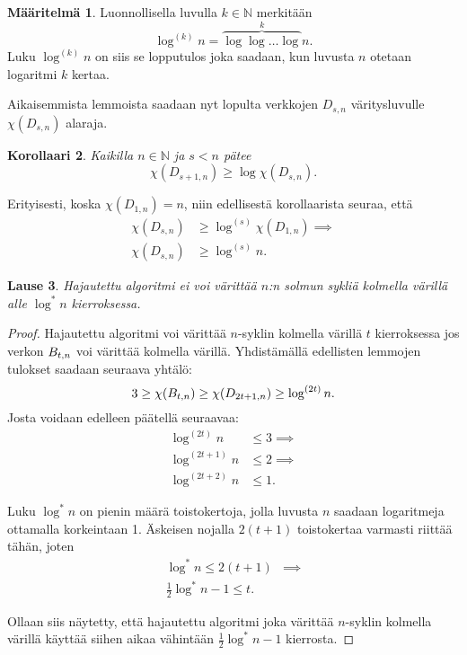 \documentclass[finnish]{tktltiki2}
\newtheorem{lau}{Lause}
\newtheorem{kor}[lau]{Korollaari}
\theoremstyle{definition}
\newtheorem{maar}[lau]{Määritelmä}
\theoremstyle{remark}
\newcommand{\nat}{\mathbb{N}}
\newcommand{\Dsn}{D_{s,n}}
\newcommand{\Dssn}{D_{s+1,n}}
\begin{document}
\begin{maar}
    Luonnollisella luvulla $k \in \nat$ merkitään
    \begin{equation*}
        \log^{(k)} n = \overbrace{\log \log \dots \log}^{k} n.
    \end{equation*}
    Luku $\log^{(k)} n$ on siis se lopputulos joka saadaan, kun luvusta $n$
    otetaan logaritmi $k$ kertaa.
\end{maar}

Aikaisemmista lemmoista saadaan nyt lopulta verkkojen $\Dsn$ vä\-ri\-tys\-lu\-vul\-le
$\chi(\Dsn)$ alaraja.

\begin{kor}
    Kaikilla $n \in \nat$ ja $s < n$ pätee
    \begin{equation*}
        \chi(\Dssn) \geq \log \chi(\Dsn).
    \end{equation*}
\end{kor}

Erityisesti, koska $\chi(D_{1,n}) = n$, niin edellisestä korollaarista seuraa, että
%
\begin{align*}
    \chi(\Dsn) &\geq \log^{(s)} \chi(D_{1,n}) \implies \\
    \chi(\Dsn) &\geq \log^{(s)} n.
\end{align*}

\begin{lau}
    Hajautettu algoritmi ei voi värittää $n$:n solmun sykliä kolmella värillä
    alle $\log^* n$ kierroksessa.
\end{lau}

\begin{proof}
    Hajautettu algoritmi voi värittää $n$-syklin kolmella värillä $t$
    kierroksessa jos verkon $B_{t,n}$ voi värittää kolmella värillä. Yhdistämällä
    edellisten lemmojen tulokset saadaan seuraava yhtälö:
    \begin{equation*}
        3 \geq \chi(B_{t,n}) \geq \chi(D_{2t+1, n}) \geq \log^{(2t)} n.
    \end{equation*}
    Josta voidaan edelleen päätellä seuraavaa:
    \begin{align*}
        \log^{(2t)}   n &\leq 3 \implies \\
        \log^{(2t+1)} n &\leq 2 \implies \\
        \log^{(2t+2)} n &\leq 1.
    \end{align*}

    Luku $\log^* n$ on pienin määrä toistokertoja, jolla luvusta $n$ saadaan
    logaritmeja ottamalla korkeintaan 1. Äskeisen nojalla $2(t+1)$ toistokertaa
    varmasti riittää tähän, joten
    \begin{align*}
        \log^* n \leq 2(t+1)            & \implies \\
        \frac{1}{2} \log^* n - 1 \leq t. &
    \end{align*}

    Ollaan siis näytetty, että hajautettu algoritmi joka värittää $n$-syklin
    kolmella värillä käyttää siihen aikaa vähintään $\frac{1}{2} \log^* n - 1$
    kierrosta.
\end{proof}
\end{document}
